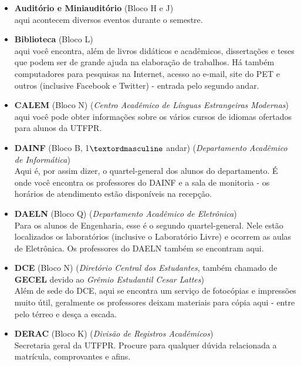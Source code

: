 \documentclass[a4paper,12pt,openany]{article}
\begin{document}
\begin{itemize}

\item \textbf{Auditório e Miniauditório} (Bloco H e J)\\ aqui acontecem diversos eventos durante o semestre.

\item \textbf{Biblioteca} (Bloco L) \\aqui você encontra, além de livros didáticos e acadêmicos, dissertações e teses que podem ser de grande ajuda na elaboração de trabalhos. Há também computadores para pesquisas na Internet, acesso ao e-mail, site do PET e outros (inclusive Facebook e Twitter) - entrada pelo segundo andar.

\item \textbf{CALEM} (Bloco N) (\textit{Centro Acadêmico de Línguas Estrangeiras Modernas}) \\aqui você pode obter informações sobre os vários cursos de idiomas ofertados para alunos da UTFPR.

\item \textbf{DAINF} (Bloco B, 1$\textordmasculine$ andar) (\textit{Departamento Acadêmico de Informática}) \\Aqui é, por assim dizer, o quartel-general dos alunos do departamento. É onde você encontra os professores do DAINF e a sala de monitoria - os horários de atendimento estão disponíveis na recepção.

\item \textbf{DAELN} (Bloco Q) (\textit{Departamento Acadêmico de Eletrônica})\\ Para os alunos de Engenharia, esse é o segundo quartel-general. Nele estão localizados os laboratórios (inclusive o Laboratório Livre) e ocorrem as aulas de Eletrônica. Os professores do DAELN também se encontram aqui.

\item \textbf{DCE} (Bloco N) (\textit{Diretório Central dos Estudantes}, também chamado de \textbf{GECEL} devido ao \textit{Grêmio Estudantil Cesar Lattes})\\ Além de sede do DCE, aqui se encontra um serviço de fotocópias e impressões muito útil, geralmente os professores deixam materiais para cópia aqui - entre pelo térreo e desça a escada.

\item \textbf{DERAC} (Bloco K) (\textit{Divisão de Registros Acadêmicos})\\ Secretaria geral da UTFPR. Procure para qualquer dúvida relacionada a matrícula, comprovantes e afins.


\end{itemize}
\end{document}
